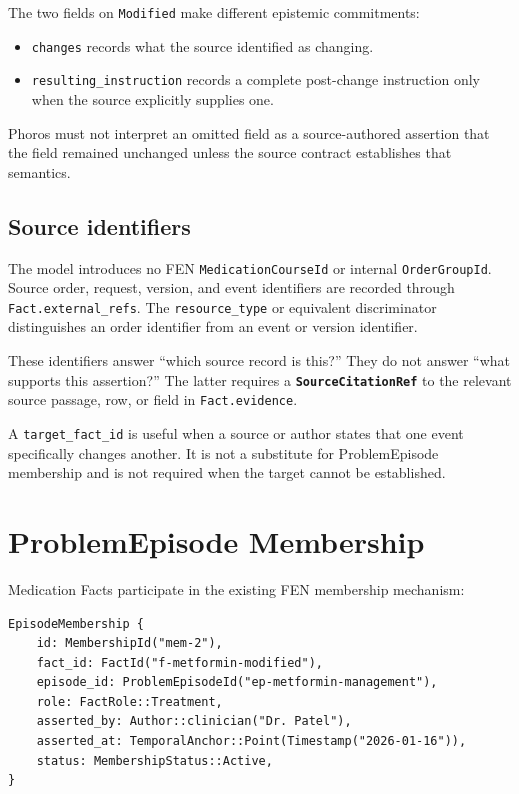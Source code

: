 \documentclass[11pt]{article}
\newcommand{\entity}[1]{\texttt{\textbf{#1}}}
\newcommand{\field}[1]{\texttt{#1}}
\begin{document}
The two fields on \field{Modified} make different epistemic commitments:

\begin{itemize}[noitemsep]
  \item \field{changes} records what the source identified as changing.
  \item \field{resulting\_instruction} records a complete post-change
    instruction only when the source explicitly supplies one.
\end{itemize}

Phoros must not interpret an omitted field as a source-authored assertion that
the field remained unchanged unless the source contract establishes that
semantics.

\subsection{Source identifiers}

The model introduces no FEN \field{MedicationCourseId} or internal
\field{OrderGroupId}. Source order, request, version, and event identifiers
are recorded through \field{Fact.external\_refs}. The
\field{resource\_type} or equivalent discriminator distinguishes an order
identifier from an event or version identifier.

These identifiers answer ``which source record is this?'' They do not answer
``what supports this assertion?'' The latter requires a
\entity{SourceCitationRef} to the relevant source passage, row, or field in
\field{Fact.evidence}.

A \field{target\_fact\_id} is useful when a source or author states that one
event specifically changes another. It is not a substitute for
ProblemEpisode membership and is not required when the target cannot be
established.

\section{ProblemEpisode Membership}
\label{sec:problem-episode-membership}

Medication Facts participate in the existing FEN membership mechanism:

\begin{lstlisting}
EpisodeMembership {
    id: MembershipId("mem-2"),
    fact_id: FactId("f-metformin-modified"),
    episode_id: ProblemEpisodeId("ep-metformin-management"),
    role: FactRole::Treatment,
    asserted_by: Author::clinician("Dr. Patel"),
    asserted_at: TemporalAnchor::Point(Timestamp("2026-01-16")),
    status: MembershipStatus::Active,
}
\end{lstlisting}
\end{document}
